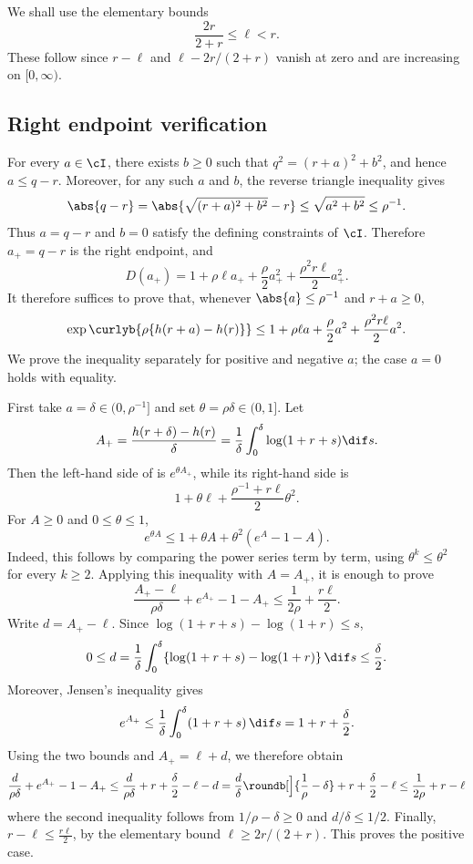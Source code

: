 \documentclass[11pt]{article}
\let\cref\zcref
\begin{document}
We shall use the elementary bounds
\[
  \frac{2r}{2+r}\leq\ell<r.
\]
These follow since $r-\ell$ and $\ell-2r/(2+r)$ vanish at zero and are increasing on $[0,\infty)$.

\subsection{Right endpoint verification} For every $a\in\cI$, there exists $b\geq0$ such that $q^2=(r+a)^2+b^2$, and hence $a\leq q-r$. Moreover, for any such $a$ and $b$, the reverse triangle inequality gives
\[
  \abs{q-r}=\abs{\sqrt{(r+a)^2+b^2}-r}\leq\sqrt{a^2+b^2}\leq\rho^{-1}.
\]
Thus $a=q-r$ and $b=0$ satisfy the defining constraints of $\cI$. Therefore $a_+=q-r$ is the right endpoint, and
\[
  D(a_+) = 1 + \rho \ell a_+ + \frac{\rho}{2}a_+^2 + \frac{\rho^2 r \ell}{2} a_+^2.
\]
It therefore suffices to prove that, whenever $\abs{a}\leq\rho^{-1}$ and $r+a\geq0$,
\begin{equation}\label{eq:right-endpoint-estimate}
  \exp\curlyb{\rho\{h(r+a)-h(r)\}}
  \leq
  1+\rho\ell a+\frac{\rho}{2}a^2+\frac{\rho^2r\ell}{2}a^2.
\end{equation}
We prove the inequality separately for positive and negative $a$; the case $a=0$ holds with equality.

First take $a=\delta\in(0,\rho^{-1}]$ and set $\theta=\rho\delta\in(0,1]$. Let
\[
  A_+=\frac{h(r+\delta)-h(r)}{\delta}=\frac1\delta\int_0^\delta\log(1+r+s)\dif s.
\]
Then the left-hand side of \cref{eq:right-endpoint-estimate} is $e^{\theta A_+}$, while its right-hand side is
\[
  1+\theta\ell+\frac{\rho^{-1}+r\ell}{2}\theta^2.
\]
For $A\geq0$ and $0\leq\theta\leq1$,
\[
  e^{\theta A}\leq1+\theta A+\theta^2(e^A-1-A).
\]
Indeed, this follows by comparing the power series term by term, using $\theta^k\leq\theta^2$ for every $k\geq2$. Applying this inequality with $A=A_+$, it is enough to prove
\[
  \frac{A_+-\ell}{\rho\delta}+e^{A_+}-1-A_+\leq\frac{1}{2\rho} + \frac{r\ell}{2}.
\]
Write $d=A_+-\ell$. Since $\log(1+r+s)-\log(1+r)\leq s$,
\[
  0\leq d=\frac1\delta\int_0^\delta\{\log(1+r+s)-\log(1+r)\}\,\dif s\leq\frac\delta2.
\]
Moreover, Jensen's inequality gives
\[
  e^{A_+}\leq\frac1\delta\int_0^\delta(1+r+s)\,\dif s=1+r+\frac\delta2.
\]
Using the two bounds and $A_+=\ell+d$, we therefore obtain
\[
  \frac{d}{\rho\delta} + e^{A_+} - 1 - A_+ \leq \frac{d}{\rho\delta} + r + \frac{\delta}{2} - \ell - d
  = \frac{d}{\delta}\roundb[\Big]{\frac{1}{\rho} - \delta} + r + \frac{\delta}{2} - \ell
  \leq\frac{1}{2\rho} + r - \ell
\]
where the second inequality follows from $1/\rho - \delta \geq 0$ and $d/\delta\leq1/2$. Finally, $r - \ell \leq \frac{r\ell}{2}$, by the elementary bound $\ell \geq 2r/(2+r)$. This proves the positive case.
\end{document}

